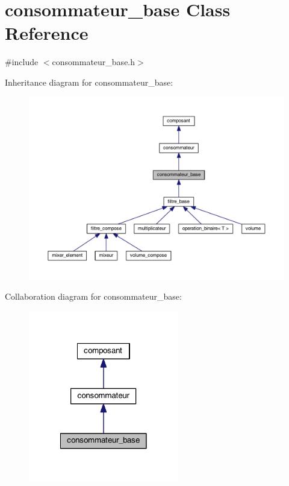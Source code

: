 \hypertarget{classconsommateur__base}{\section{consommateur\-\_\-base Class Reference}
\label{classconsommateur__base}
}


{\ttfamily \#include $<$consommateur\-\_\-base.\-h$>$}



Inheritance diagram for consommateur\-\_\-base\-:
\nopagebreak
\begin{figure}[H]
\begin{center}
\leavevmode
\includegraphics[width=350pt]{classconsommateur__base__inherit__graph}
\end{center}
\end{figure}


Collaboration diagram for consommateur\-\_\-base\-:
\nopagebreak
\begin{figure}[H]
\begin{center}
\leavevmode
\includegraphics[width=186pt]{classconsommateur__base__coll__graph}
\end{center}
\end{figure}
